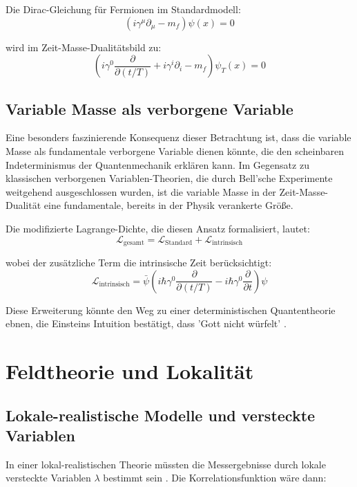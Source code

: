 \documentclass[a4paper,12pt]{article}
\begin{document}
	Die Dirac-Gleichung für Fermionen im Standardmodell:
	\begin{equation}
		(i\gamma^\mu\partial_\mu - m_f) \psi(x) = 0
	\end{equation}
	
	wird im Zeit-Masse-Dualitätsbild zu:
	\begin{equation}
		\left(i\gamma^0\frac{\partial}{\partial(t/T)} + i\gamma^i\partial_i - m_f\right) \psi_T(x) = 0
	\end{equation}
	
	\subsection{Variable Masse als verborgene Variable}
	
	Eine besonders faszinierende Konsequenz dieser Betrachtung ist, dass die variable Masse als fundamentale verborgene Variable dienen könnte, die den scheinbaren Indeterminismus der Quantenmechanik erklären kann. Im Gegensatz zu klassischen verborgenen Variablen-Theorien, die durch Bell'sche Experimente weitgehend ausgeschlossen wurden, ist die variable Masse in der Zeit-Masse-Dualität eine fundamentale, bereits in der Physik verankerte Größe.
	
	Die modifizierte Lagrange-Dichte, die diesen Ansatz formalisiert, lautet:
	\begin{equation}
		\mathcal{L}_\text{gesamt} = \mathcal{L}_\text{Standard} + \mathcal{L}_\text{intrinsisch}
	\end{equation}
	
	wobei der zusätzliche Term die intrinsische Zeit berücksichtigt:
	\begin{equation}
		\mathcal{L}_\text{intrinsisch} = \bar{\psi}\left(i\hbar\gamma^0 \frac{\partial}{\partial (t/T)} - i\hbar\gamma^0 \frac{\partial}{\partial t}\right)\psi
	\end{equation}
	
	Diese Erweiterung könnte den Weg zu einer deterministischen Quantentheorie ebnen, die Einsteins Intuition bestätigt, dass 'Gott nicht würfelt' \cite{Pascher2024}.
	
	\section{Feldtheorie und Lokalität}
	
	\subsection{Lokale-realistische Modelle und versteckte Variablen}
	In einer lokal-realistischen Theorie müssten die Messergebnisse durch lokale versteckte Variablen $\lambda$ bestimmt sein \cite{Bell1964}. Die Korrelationsfunktion wäre dann:
	
\end{document}
